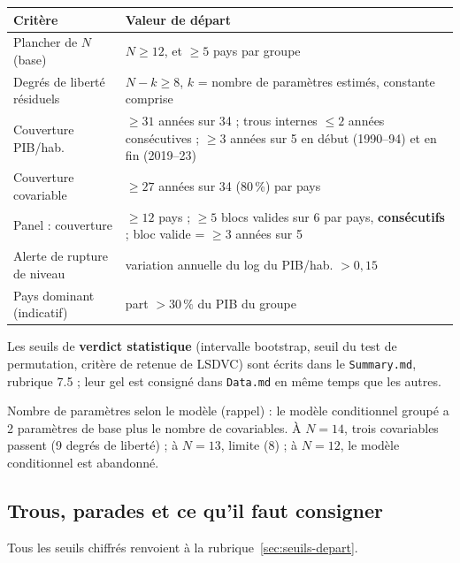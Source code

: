 \documentclass[21pt,a4paper]{article}
\begin{document}
	\begin{center}
		\small
		\begin{tabularx}{\textwidth}{@{}L{4.4cm}Y@{}}
			\toprule
			\textbf{Critère} & \textbf{Valeur de départ} \\
			\midrule
			Plancher de $N$ (base) & $N \geq 12$, et $\geq 5$ pays par groupe \\
			\addlinespace
			Degrés de liberté résiduels & $N - k \geq 8$, $k$ = nombre de paramètres estimés, constante comprise \\
			\addlinespace
			Couverture PIB/hab. & $\geq 31$ années sur 34 ; trous internes $\leq 2$ années consécutives ; $\geq 3$ années sur 5 en début (1990--94) et en fin (2019--23) \\
			\addlinespace
			Couverture covariable & $\geq 27$ années sur 34 (80\,\%) par pays \\
			\addlinespace
			Panel : couverture & $\geq 12$ pays ; $\geq 5$ blocs valides sur 6 par pays, \textbf{consécutifs} ; bloc valide = $\geq 3$ années sur 5 \\
			\addlinespace
			Alerte de rupture de niveau & variation annuelle du log du PIB/hab. $> 0{,}15$ \\
			\addlinespace
			Pays dominant (indicatif) & part $> 30\,\%$ du PIB du groupe \\
			\bottomrule
		\end{tabularx}
	\end{center}
	
	Les seuils de \textbf{verdict statistique} (intervalle bootstrap, seuil du test de permutation, critère de retenue de LSDVC) sont écrits dans le \texttt{Summary.md}, rubrique 7.5 ; leur gel est consigné dans \texttt{Data.md} en même temps que les autres.
	
	Nombre de paramètres selon le modèle (rappel) : le modèle conditionnel groupé a 2 paramètres de base plus le nombre de covariables. À $N = 14$, trois covariables passent (9 degrés de liberté) ; à $N = 13$, limite (8) ; à $N = 12$, le modèle conditionnel est abandonné.
	
	\subsection{Trous, parades et ce qu'il faut consigner}
	\label{sec:trous-parades}
	
	Tous les seuils chiffrés renvoient à la rubrique~\ref{sec:seuils-depart}.
	
\end{document}
